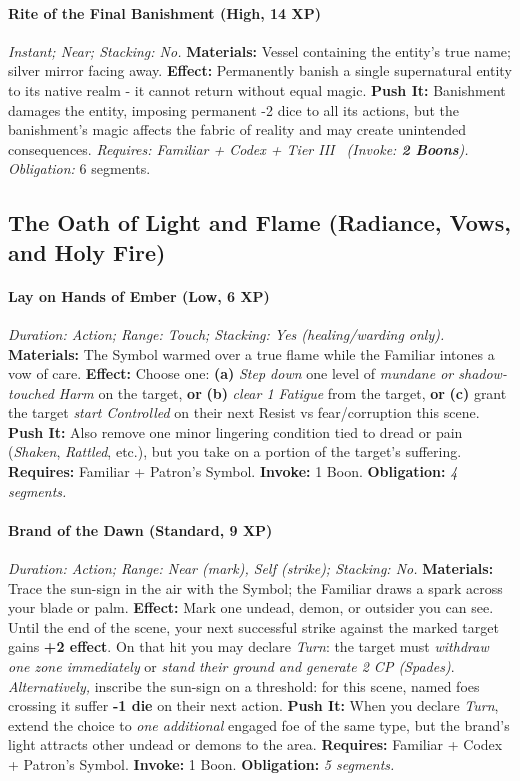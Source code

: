 \documentclass[12pt,twoside]{book}
\begin{document}
\paragraph{Rite of the Final Banishment (High, 14 XP)} \emph{Instant; Near; Stacking: No.}
\textbf{Materials:} Vessel containing the entity's true name; silver mirror facing away.
\textbf{Effect:} Permanently banish a single supernatural entity to its native realm - it cannot return without equal magic.
\textbf{Push It:} Banishment damages the entity, imposing permanent -2 dice to all its actions, but the banishment's magic affects the fabric of reality and may create unintended consequences.
\emph{Requires: Familiar + Codex + Tier III \ (\textit{Invoke:} \textbf{2 Boons}).}
\emph{Obligation:} 6 segments.

\subsection{The Oath of Light and Flame (Radiance, Vows, and Holy Fire)}
\paragraph{Lay on Hands of Ember (Low, 6 XP)} \emph{Duration: Action; Range: Touch; Stacking: Yes (healing/warding only).}  
\textbf{Materials:} The Symbol warmed over a true flame while the Familiar intones a vow of care.  
\textbf{Effect:} Choose one: \textbf{(a)} \emph{Step down} one level of \emph{mundane or shadow-touched Harm} on the target, \textbf{or} \textbf{(b)} \emph{clear 1 Fatigue} from the target, \textbf{or} \textbf{(c)} grant the target \emph{start Controlled} on their next Resist vs fear/corruption this scene.  
\textbf{Push It:} Also remove one minor lingering condition tied to dread or pain (\emph{Shaken}, \emph{Rattled}, etc.), but you take on a portion of the target's suffering.
\textbf{Requires:} Familiar + Patron's Symbol. \;\; \textbf{Invoke:} 1 Boon. \;\; \textbf{Obligation:} \emph{4 segments.}


\paragraph{Brand of the Dawn (Standard, 9 XP)} \emph{Duration: Action; Range: Near (mark), Self (strike); Stacking: No.}  
\textbf{Materials:} Trace the sun-sign in the air with the Symbol; the Familiar draws a spark across your blade or palm.  
\textbf{Effect:} Mark one undead, demon, or outsider you can see. Until the end of the scene, your next successful strike against the marked target gains \textbf{+2 effect}. On that hit you may declare \emph{Turn}: the target must \emph{withdraw one zone immediately} or \emph{stand their ground and generate 2 CP (Spades)}.  
\emph{Alternatively,} inscribe the sun-sign on a threshold: for this scene, named foes crossing it suffer \textbf{-1 die} on their next action.  
\textbf{Push It:} When you declare \emph{Turn}, extend the choice to \emph{one additional} engaged foe of the same type, but the brand's light attracts other undead or demons to the area.
\textbf{Requires:} Familiar + Codex + Patron's Symbol. \;\; \textbf{Invoke:} 1 Boon. \;\; \textbf{Obligation:} \emph{5 segments.}
\end{document}
